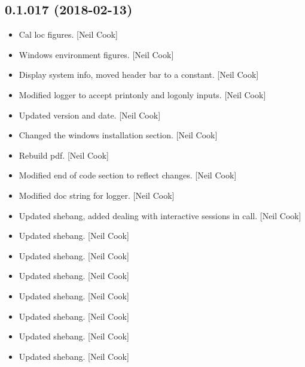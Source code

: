 \documentclass[a4paper,10pt,english]{report}
\begin{document}
\subsection{0.1.017 (2018-02-13)}
\label{\detokenize{misc/changelog:id486}}\begin{itemize}
\item {} 
Cal loc figures. {[}Neil Cook{]}

\item {} 
Windows environment figures. {[}Neil Cook{]}

\item {} 
Display system info, moved header bar to a constant. {[}Neil Cook{]}

\item {} 
Modified logger to accept printonly and logonly inputs. {[}Neil Cook{]}

\item {} 
Updated version and date. {[}Neil Cook{]}

\item {} 
Changed the windows installation section. {[}Neil Cook{]}

\item {} 
Rebuild pdf. {[}Neil Cook{]}

\item {} 
Modified end of code section to reflect changes. {[}Neil Cook{]}

\item {} 
Modified doc string for logger. {[}Neil Cook{]}

\item {} 
Updated shebang, added  dealing with interactive sessions
in  call. {[}Neil Cook{]}

\item {} 
Updated shebang. {[}Neil Cook{]}

\item {} 
Updated shebang. {[}Neil Cook{]}

\item {} 
Updated shebang. {[}Neil Cook{]}

\item {} 
Updated shebang. {[}Neil Cook{]}

\item {} 
Updated shebang. {[}Neil Cook{]}

\item {} 
Updated shebang. {[}Neil Cook{]}

\item {} 
Updated shebang. {[}Neil Cook{]}


\end{itemize}
\end{document}
